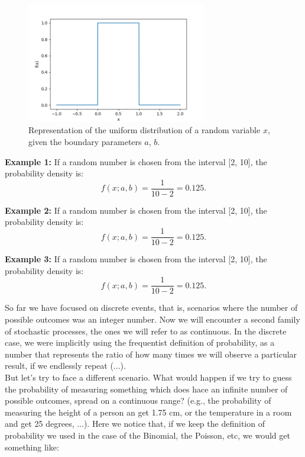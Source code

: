 \documentclass{book}
\begin{document}
\begin{figure}[ht]
    \centering
    \includegraphics[width=0.7\textwidth]{figures/chapter2/uniform.png}
    \caption{Representation of the uniform distribution of a random variable $x$, given the boundary parameters $a$, $b$.}
    \label{fig:random}
\end{figure}

\textbf{Example 1:} If a random number is chosen from the interval [2, 10], the probability density is:
\begin{equation}
    f(x; a, b) = \frac{1}{10-2} = 0.125.
\end{equation}

\textbf{Example 2:} If a random number is chosen from the interval [2, 10], the probability density is:
\begin{equation}
    f(x; a, b) = \frac{1}{10-2} = 0.125.
\end{equation}

\textbf{Example 3:} If a random number is chosen from the interval [2, 10], the probability density is:
\begin{equation}
    f(x; a, b) = \frac{1}{10-2} = 0.125.
\end{equation}

\newpage

So far we have focused on discrete events, that is, scenarios where the number of possible outcomes was an integer number. Now we will encounter a second family of stochastic processes, the ones we will refer to as continuous. In the discrete case, we were implicitly using the frequentist definition of probability, as a number that represents the ratio of how many times we will observe a particular result, if we endlessly repeat (...).\\

But let's try to face a different scenario. What would happen if we try to guess the probability of measuring something which does hace an infinite number of possible outcomes, spread on a continuous range? (e.g., the probability of measuring the height of a person an get 1.75 cm, or the temperature in a room and get 25 degrees, ...). Here we notice that, if we keep the definition of probability we used in the case of the Binomial, the Poisson, etc, we would get something like:
\end{document}
